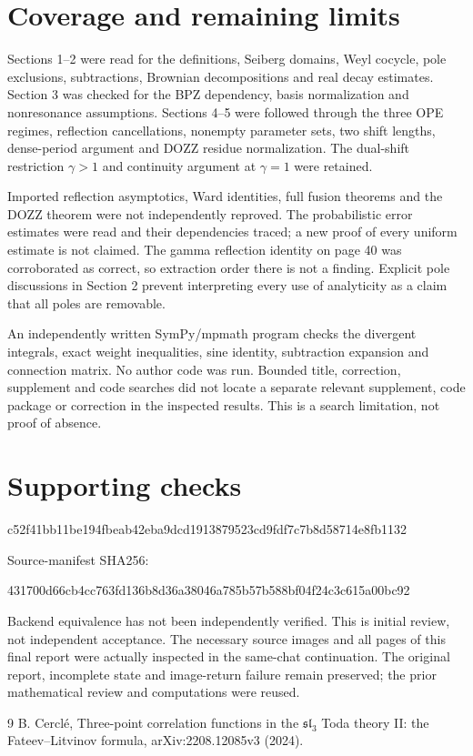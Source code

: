 \documentclass[10pt]{article}
\begin{document}
\section*{Coverage and remaining limits}
Sections 1–2 were read for the definitions, Seiberg domains, Weyl cocycle, pole exclusions, subtractions, Brownian decompositions and real decay estimates. Section 3 was checked for the BPZ dependency, basis normalization and nonresonance assumptions. Sections 4–5 were followed through the three OPE regimes, reflection cancellations, nonempty parameter sets, two shift lengths, dense-period argument and DOZZ residue normalization. The dual-shift restriction \(\gamma>1\) and continuity argument at \(\gamma=1\) were retained.\par
Imported reflection asymptotics, Ward identities, full fusion theorems and the DOZZ theorem were not independently reproved. The probabilistic error estimates were read and their dependencies traced; a new proof of every uniform estimate is not claimed. The gamma reflection identity on page 40 was corroborated as correct, so extraction order there is not a finding. Explicit pole discussions in Section 2 prevent interpreting every use of analyticity as a claim that all poles are removable.\par
An independently written SymPy/mpmath program checks the divergent integrals, exact weight inequalities, sine identity, subtraction expansion and connection matrix. No author code was run. Bounded title, correction, supplement and code searches did not locate a separate relevant supplement, code package or correction in the inspected results. This is a search limitation, not proof of absence.\par
\section*{Supporting checks}
c52f41bb11be194fbeab42eba9dcd1913879523cd9fdf7c7b8d58714e8fb1132\par
Source-manifest SHA256:\par
431700d66cb4cc763fd136b8d36a38046a785b57b588bf04f24c3c615a00bc92\par
Backend equivalence has not been independently verified. This is initial review, not independent acceptance. The necessary source images and all pages of this final report were actually inspected in the same-chat continuation. The original report, incomplete state and image-return failure remain preserved; the prior mathematical review and computations were reused.\par
9 B. Cerclé, Three-point correlation functions in the \(\mathfrak{sl}_3\) Toda theory II: the Fateev–Litvinov formula, arXiv:2208.12085v3 (2024).\par
\end{document}
